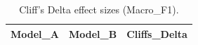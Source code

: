 \begin{table}[t]
\centering
\begin{tabular}{lll}
\toprule
Model_A & Model_B & Cliffs_Delta \\
\midrule
\bottomrule
\end{tabular}
\caption{Cliff's Delta effect sizes (Macro_F1).}
\label{tab:cliffs_Macro_F1}
\end{table}